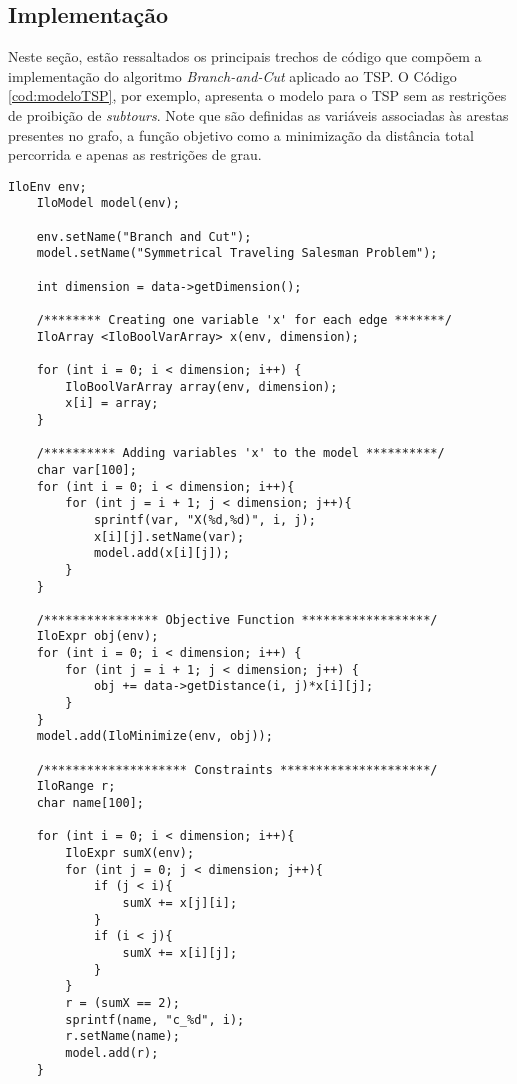 \subsection{Implementação} \label{sec:implementacao}

Neste seção, estão ressaltados os principais trechos de código que compõem a implementação do algoritmo \textit{Branch-and-Cut} aplicado ao TSP. O Código \ref{cod:modeloTSP}, por exemplo, apresenta o modelo para o TSP sem as restrições de proibição de \textit{subtours}. Note que são definidas as variáveis associadas às arestas presentes no grafo, a função objetivo como a minimização da distância total percorrida e apenas as restrições de grau.  

\begin{lstlisting}[style=cplusplusListStyle, caption= Modelo TSP sem as restrições de proibição de subtours, label=cod:modeloTSP]
    IloEnv env;
    IloModel model(env);

    env.setName("Branch and Cut");
    model.setName("Symmetrical Traveling Salesman Problem");

    int dimension = data->getDimension();

    /******** Creating one variable 'x' for each edge *******/
    IloArray <IloBoolVarArray> x(env, dimension);

    for (int i = 0; i < dimension; i++) {
        IloBoolVarArray array(env, dimension);
        x[i] = array;
    }

    /********** Adding variables 'x' to the model **********/
    char var[100];
    for (int i = 0; i < dimension; i++){
        for (int j = i + 1; j < dimension; j++){
            sprintf(var, "X(%d,%d)", i, j);
            x[i][j].setName(var);
            model.add(x[i][j]);
        }
    }
    
    /**************** Objective Function ******************/
    IloExpr obj(env);
    for (int i = 0; i < dimension; i++) {
        for (int j = i + 1; j < dimension; j++) {
            obj += data->getDistance(i, j)*x[i][j];
        }
    }
    model.add(IloMinimize(env, obj));
    
    /******************** Constraints *********************/
    IloRange r;
    char name[100];

    for (int i = 0; i < dimension; i++){
        IloExpr sumX(env);
        for (int j = 0; j < dimension; j++){
            if (j < i){
                sumX += x[j][i];
            }
            if (i < j){
                sumX += x[i][j];
            }
        }
        r = (sumX == 2);
        sprintf(name, "c_%d", i);
        r.setName(name);
        model.add(r);
    }
\end{lstlisting}

